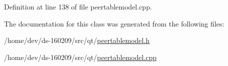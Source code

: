 Definition at line 138 of file peertablemodel.\+cpp.



The documentation for this class was generated from the following files\+:\begin{DoxyCompactItemize}
\item 
/home/dev/ds-\/160209/src/qt/\hyperlink{peertablemodel_8h}{peertablemodel.\+h}\item 
/home/dev/ds-\/160209/src/qt/\hyperlink{peertablemodel_8cpp}{peertablemodel.\+cpp}\end{DoxyCompactItemize}
